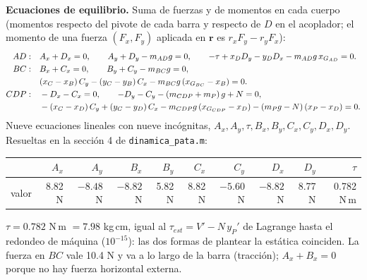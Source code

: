 \documentclass[11pt,a4paper]{article}
\begin{document}
\textbf{Ecuaciones de equilibrio.} Suma de fuerzas y de momentos en cada cuerpo (momentos respecto del pivote
de cada barra y respecto de \(D\) en el acoplador; el momento de una fuerza \((F_x,F_y)\) aplicada en
\(\mathbf{r}\) es \(r_xF_y-r_yF_x\)):
\begin{align}
AD:&\quad A_x+D_x=0,\qquad A_y+D_y-m_{AD}g=0,\qquad -\tau+x_D D_y-y_D D_x-m_{AD}g\,x_{G_{AD}}=0. \label{eq:AD}\\
BC:&\quad B_x+C_x=0,\qquad B_y+C_y-m_{BC}g=0, \notag\\
   &\quad (x_C-x_B)\,C_y-(y_C-y_B)\,C_x-m_{BC}g\,(x_{G_{BC}}-x_B)=0. \label{eq:BC}\\
CDP:&\quad -D_x-C_x=0,\qquad -D_y-C_y-(m_{CDP}+m_P)\,g+N=0, \notag\\
   &\quad -(x_C-x_D)\,C_y+(y_C-y_D)\,C_x-m_{CDP}g\,(x_{G_{CDP}}-x_D)-(m_Pg-N)\,(x_P-x_D)=0. \label{eq:CDP}
\end{align}
Nueve ecuaciones lineales con nueve incógnitas, \(A_x,A_y,\tau,B_x,B_y,C_x,C_y,D_x,D_y\). Resueltas en la
sección 4 de \texttt{dinamica\_pata.m}:

\begin{center}\small
\begin{tabular}{lrrrrrrrrr}
\toprule
 & \(A_x\) & \(A_y\) & \(B_x\) & \(B_y\) & \(C_x\) & \(C_y\) & \(D_x\) & \(D_y\) & \(\tau\) \\
\midrule
valor & 8.82 N & \(-8.48\) N & \(-8.82\) N & 5.82 N & 8.82 N & \(-5.60\) N & \(-8.82\) N & 8.77 N & 0.782 N\,m \\
\bottomrule
\end{tabular}
\end{center}

\(\tau=0.782\) N\,m \(=7.98\) kg\,cm, igual al \(\tau_{est}=V'-N\,y_P'\) de Lagrange hasta el redondeo de
máquina (\(10^{-15}\)): las dos formas de plantear la estática coinciden. La fuerza en \(BC\) vale 10.4 N y
va a lo largo de la barra (tracción); \(A_x+B_x=0\) porque no hay fuerza horizontal externa.
\end{document}
